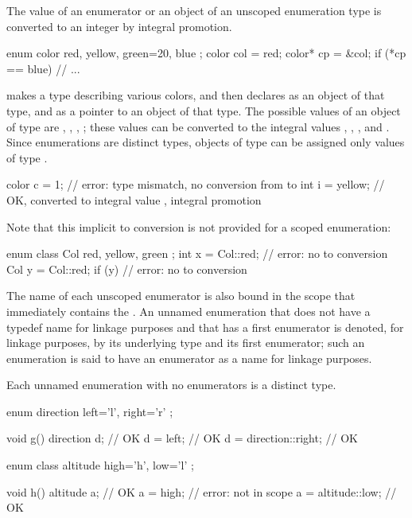 \pnum
The value of an enumerator or an object of an unscoped enumeration type is
converted to an integer by integral promotion.
\begin{example}
\begin{codeblock}
enum color { red, yellow, green=20, blue };
color col = red;
color* cp = &col;
if (*cp == blue)                // ...
\end{codeblock}
makes  a type describing various colors, and then declares
 as an object of that type, and  as a pointer to an
object of that type. The possible values of an object of type
 are , , ,
; these values can be converted to the integral values
, , , and . Since enumerations are
distinct types, objects of type  can be assigned only
values of type .
\begin{codeblock}
color c = 1;                    // error: type mismatch, no conversion from  to 
int i = yellow;                 // OK,  converted to integral value , integral promotion
\end{codeblock}
Note that this implicit  to 
conversion is not provided for a scoped enumeration:
\begin{codeblock}
enum class Col { red, yellow, green };
int x = Col::red;               // error: no  to  conversion
Col y = Col::red;
if (y) { }                      // error: no  to  conversion
\end{codeblock}
\end{example}

\pnum
{}%
The name of each unscoped enumerator is also bound
in the scope that immediately contains the .
An unnamed enumeration
that does not have a typedef name for linkage purposes and
that has a first enumerator
is denoted, for linkage purposes,
by its underlying type and its first enumerator;
such an enumeration is said to have
an enumerator as a name for linkage purposes.
\begin{note}
Each unnamed enumeration with no enumerators is a distinct type.
\end{note}
\begin{example}
\begin{codeblock}
enum direction { left='l', right='r' };

void g() {
  direction d;                  // OK
  d = left;                     // OK
  d = direction::right;         // OK
}

enum class altitude { high='h', low='l' };

void h() {
  altitude a;                   // OK
  a = high;                     // error:  not in scope
  a = altitude::low;            // OK
}
\end{codeblock}
\end{example}

